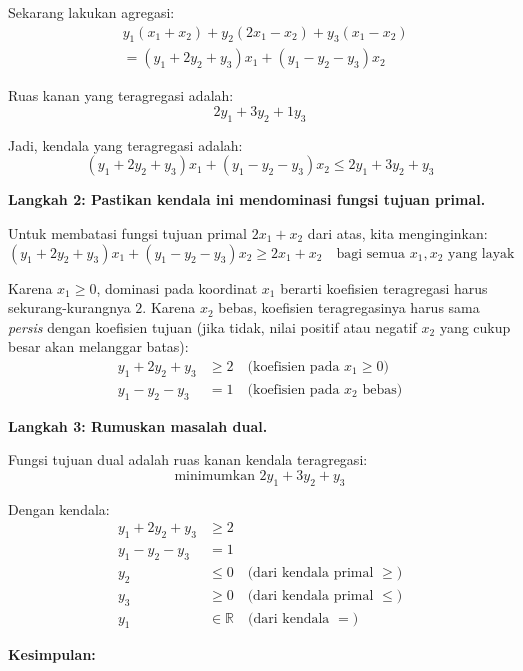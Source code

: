 Sekarang lakukan agregasi:
\[
\begin{aligned}
& y_1(x_1 + x_2) + y_2(2x_1 - x_2) + y_3(x_1 - x_2) \\
&= (y_1 + 2y_2 + y_3)x_1 + (y_1 - y_2 - y_3)x_2
\end{aligned}
\]

Ruas kanan yang teragregasi adalah:
\[
2y_1 + 3y_2 + 1y_3
\]

Jadi, kendala yang teragregasi adalah:
\[
(y_1 + 2y_2 + y_3)x_1 + (y_1 - y_2 - y_3)x_2 \leq 2y_1 + 3y_2 + y_3
\]

\vspace{0.5em}
\textbf{Langkah 2: Pastikan kendala ini mendominasi fungsi tujuan primal.}

Untuk membatasi fungsi tujuan primal \( 2x_1 + x_2 \) dari atas, kita menginginkan:
\[
(y_1 + 2y_2 + y_3)x_1 + (y_1 - y_2 - y_3)x_2 \geq 2x_1 + x_2 \quad \text{bagi semua } x_1, x_2 \text{ yang layak}
\]

Karena \( x_1 \geq 0 \), dominasi pada koordinat \( x_1 \) berarti koefisien teragregasi harus sekurang-kurangnya \( 2 \). Karena \( x_2 \) bebas, koefisien teragregasinya harus sama \emph{persis} dengan koefisien tujuan (jika tidak, nilai positif atau negatif \( x_2 \) yang cukup besar akan melanggar batas):
\[
\begin{aligned}
y_1 + 2y_2 + y_3 &\geq 2 \quad \text{(koefisien pada } x_1 \geq 0) \\
y_1 - y_2 - y_3 &= 1 \quad \text{(koefisien pada } x_2 \text{ bebas})
\end{aligned}
\]

\vspace{0.5em}
\textbf{Langkah 3: Rumuskan masalah dual.}

Fungsi tujuan dual adalah ruas kanan kendala teragregasi:
\[
\text{minimumkan } 2y_1 + 3y_2 + y_3
\]

Dengan kendala:
\[
\begin{aligned}
y_1 + 2y_2 + y_3 &\geq 2 \\
y_1 - y_2 - y_3 &= 1 \\
y_2 &\leq 0 \quad \text{(dari kendala primal } \geq\text{)} \\
y_3 &\geq 0 \quad \text{(dari kendala primal } \leq\text{)} \\
y_1 &\in \mathbb{R} \quad \text{(dari kendala } =\text{)}
\end{aligned}
\]

\vspace{0.5em}
\textbf{Kesimpulan:}

